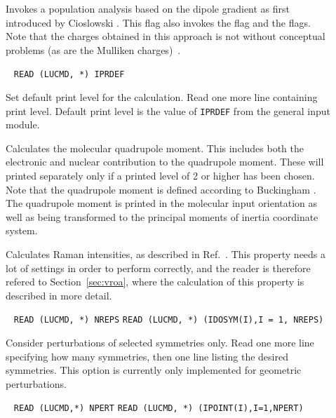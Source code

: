 \begin{description}
\item[] Invokes a population analysis based on the 
dipole gradient as first introduced by Cioslowski \cite{jcjacs111}.
This flag also invokes the  flag and the  flags. Note that the charges obtained in this approach is not without conceptual problems (as are the Mulliken charges)~\cite{hskrpeojcp???}.

\item[]\verb| |
\newline
\verb|READ (LUCMD, *) IPRDEF|

Set default print level for the calculation.  Read one
more line containing print level. Default print level is the
value of \verb|IPRDEF| from the general input module.

\item[] Calculates the molecular quadrupole
moment. This
includes both the electronic and nuclear contribution to the
quadrupole moment. These will printed separately only if a printed
level of 2 or higher has been chosen. Note that the quadrupole moment is
defined according to Buckingham \cite{adbacp12}. The quadrupole moment
is printed in the molecular input orientation as well as being 
transformed to the principal moments of inertia coordinate system.

\item[] Calculates Raman intensities, as described in 
Ref.~\cite{thkrklbpjjofd99}. This property needs a lot of settings
in order to perform correctly, and the reader is therefore refered to
Section~\ref{sec:vroa}, where the
calculation of this property is described in more detail.

\item[] \verb| |\newline
\verb|READ (LUCMD, *) NREPS|\newline
\verb|READ (LUCMD, *) (IDOSYM(I),I = 1, NREPS)|

Consider perturbations of selected symmetries only.  Read one more
line specifying how many symmetries, then one line listing the
desired symmetries. This option is currently only implemented
for geometric perturbations. 


\item[]\verb| |
\newline
\verb|READ (LUCMD,*) NPERT|\newline
\verb|READ (LUCMD, *) (IPOINT(I),I=1,NPERT)|


\end{description}
